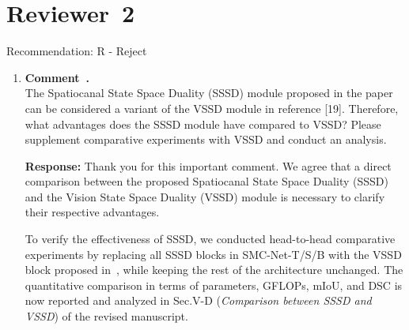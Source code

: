 \documentclass[11pt]{article}
\newcommand{\reviewersection}[1]{\section*{Reviewer~#1}}
\newcommand{\commentresponse}[2]{{\color{blue}\textbf{Response:} #2}}
\newcommand{\commentitem}{\item \textbf{Comment~\arabic{enumi}.}\\\ignorespaces}
\begin{document}
\reviewersection{2}
Recommendation: R - Reject
\begin{enumerate}
    \commentitem The Spatiocanal State Space Duality (SSSD) module proposed in the paper can be considered a variant of the VSSD module in reference [19]. Therefore, what advantages does the SSSD module have compared to VSSD? Please supplement comparative experiments with VSSD and conduct an analysis.
    
    \commentresponse{1}{
    Thank you for this important comment.
    We agree that a direct comparison between the proposed Spatiocanal State Space Duality (SSSD) and the Vision State Space Duality (VSSD) module is necessary to clarify their respective advantages.

    To verify the effectiveness of SSSD, we conducted head-to-head comparative experiments by replacing all SSSD blocks in SMC-Net-T/S/B with the VSSD block proposed in~\cite{shi2024vssdvisionmambanoncausal}, while keeping the rest of the architecture unchanged.
    The quantitative comparison in terms of parameters, GFLOPs, mIoU, and DSC is now reported and analyzed in Sec.V-D (\emph{Comparison between SSSD and VSSD}) of the revised manuscript.

}
\end{enumerate}
\end{document}
